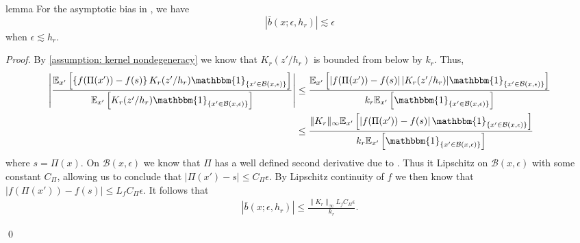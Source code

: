 \documentclass[11pt]{article}
\begin{document}


\begin{restatable}{lemma}{}\label{lemma: bias bound}
    For the asymptotic bias in , we have
    \begin{equation}
        |\bar{b}(x;\epsilon, h_r)| \lesssim \epsilon
    \end{equation}
    when $\epsilon \lesssim h_r$.
\end{restatable}
\noindent \textit{Proof.} By \cref{assumption: kernel nondegeneracy} we know that $K_r(z'/h_r)$ is bounded from below by $k_r$. Thus,
\begin{align*}
    \left|\frac{\mathbb{E}_{x'}\left[\left\{f(\Pi(x')) - f(s)\right\}K_r(z'/h_r)\mathbbm{1}_{\{x'\in \mathcal{B}(x, \epsilon)\}}\right]}{\mathbb{E}_{x'}\left[K_r(z'/h_r)\mathbbm{1}_{\{x'\in \mathcal{B}(x, \epsilon)\}}\right]}\right| &\leq \frac{\mathbb{E}_{x'}\left[\left|f(\Pi(x')) - f(s)\right||K_r(z'/h_r)|\mathbbm{1}_{\{x'\in \mathcal{B}(x, \epsilon)\}}\right]}{k_r\mathbb{E}_{x'}\left[\mathbbm{1}_{\{x'\in \mathcal{B}(x, \epsilon)\}}\right]} \\
    &\leq \frac{\|K_r\|_{\infty}\mathbb{E}_{x'}\left[\left|f(\Pi(x')) - f(s)\right|\mathbbm{1}_{\{x'\in \mathcal{B}(x, \epsilon)\}}\right]}{k_r\mathbb{E}_{x'}\left[\mathbbm{1}_{\{x'\in \mathcal{B}(x, \epsilon)\}}\right]}
\end{align*}
where $s = \Pi(x)$. On $\mathcal{B}(x, \epsilon)$ we know that $\Pi$ has a well defined second derivative due to . Thus it Lipschitz on $\mathcal{B}(x, \epsilon)$ with some constant $C_{\Pi}$, allowing us to conclude that $|\Pi(x') - s| \leq C_{\Pi}\epsilon.$ By Lipschitz continuity of $f$ we then know that $|f(\Pi(x')) - f(s)| \leq L_fC_{\Pi}\epsilon$. It follows that
\begin{align}
    |\bar{b}(x; \epsilon, h_r)|\leq \frac{\|K_r\|_{\infty}L_fC_{\Pi}\epsilon}{k_r}.
\end{align}

\qed{}
\end{document}
